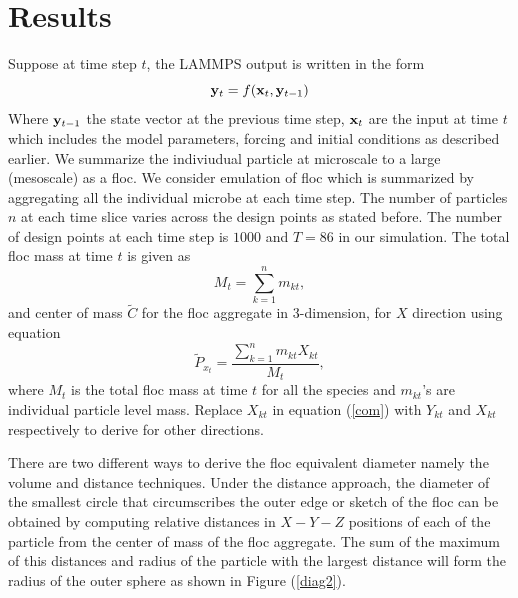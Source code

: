 \documentclass[12pt,titlepage]{report}
\newcommand{\bx}{{\bf x}}
\newcommand{\by}{{\bf y}}
\newcommand{\tC}{{\tilde {C}}}
\newcommand{\tP}{{\tilde {P}}}
\theoremstyle{definition}
\theoremstyle{remark}
\begin{document}
\section{Results}
Suppose at time step $t$, the LAMMPS output is written in the form 
\begin{equation}
\by_t=f(\bx_t,\by_{t-1})
\end{equation}
Where $\by_{t-1}$ the state vector at the previous time step, $\bx_t$ are the input at time $t$ which includes the model parameters, forcing and initial conditions as described earlier. We summarize the indiviudual particle at microscale to a large (mesoscale) as a floc. We consider emulation of floc which is summarized by aggregating all the individual microbe at each time step. The number of particles $n$ at each time slice varies across the design points as stated before. The number of design points at each time step is $1000$ and $T=86$ in our simulation. The total floc mass at time $t$ is given as
\begin{equation}
M_t =\sum^n_{k=1} m_{kt},
\end{equation} 
and center of mass $\tC$ for the floc aggregate in 3-dimension, for $X$ direction using equation 
\begin{equation}\label{com}
\tP_{x_t}=\frac{\sum^n_{k=1} m_{kt} X_{kt}}{M_t},
\end{equation}
where $M_t$ is the total floc mass at time $t$ for all the species and $m_{kt}$'s are individual particle level mass. Replace $X_{kt}$ in equation (\ref{com}) with $Y_{kt}$ and $X_{kt}$ respectively to derive for other directions.

 There are two different ways to derive the floc equivalent diameter namely the volume and distance techniques. Under the distance approach, the diameter of the smallest circle that circumscribes the outer edge or sketch of the floc can be obtained by computing relative distances in $X-Y-Z$ positions of each of the particle from the center of mass of the floc aggregate. The sum of the maximum of this distances and radius of the particle with the largest distance will form the radius of the outer sphere as shown in Figure (\ref{diag2}). 
\end{document}
